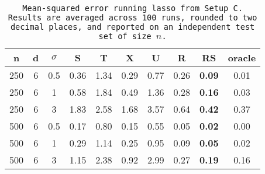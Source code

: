 \begin{table}[ht]
\centering
\begin{tabular}{cccccccccc}
  \hline
n & d & $\sigma$ & S & T & X & U & R & RS & oracle \\ 
  \hline
250 & 6 & 0.5 & 0.36 & 1.34 & 0.29 & 0.77 & 0.26 & \bf 0.09 & 0.01 \\ 
  250 & 6 & 1 & 0.58 & 1.84 & 0.49 & 1.36 & 0.28 & \bf 0.16 & 0.03 \\ 
  250 & 6 & 3 & 1.83 & 2.58 & 1.68 & 3.57 & 0.64 & \bf 0.42 & 0.37 \\ 
  500 & 6 & 0.5 & 0.17 & 0.80 & 0.15 & 0.55 & 0.05 & \bf 0.02 & 0.00 \\ 
  500 & 6 & 1 & 0.29 & 1.14 & 0.25 & 0.95 & 0.09 & \bf 0.05 & 0.02 \\ 
  500 & 6 & 3 & 1.15 & 2.38 & 0.92 & 2.99 & 0.27 & \bf 0.19 & 0.16 \\ 
   \hline
\end{tabular}
\caption{\tt Mean-squared error running \texttt{lasso} from Setup C. Results are averaged across 100 runs, rounded to two decimal places, and reported on an independent test set of size $n$.} 
\label{table:setup3}
\end{table}
